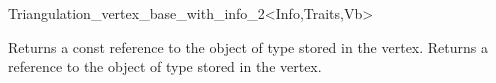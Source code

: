\begin{ccRefClass}{Triangulation_vertex_base_with_info_2<Info,Traits,Vb>}
\ccAccessFunctions
{}

\ccTagFullDeclarations

{Returns a const reference to the object of type  stored in the
vertex.}
\ccGlue
{}
{Returns a reference to the object of type  stored in the vertex.}


\ccSeeAlso

\\
 \\
 \\


\end{ccRefClass}


